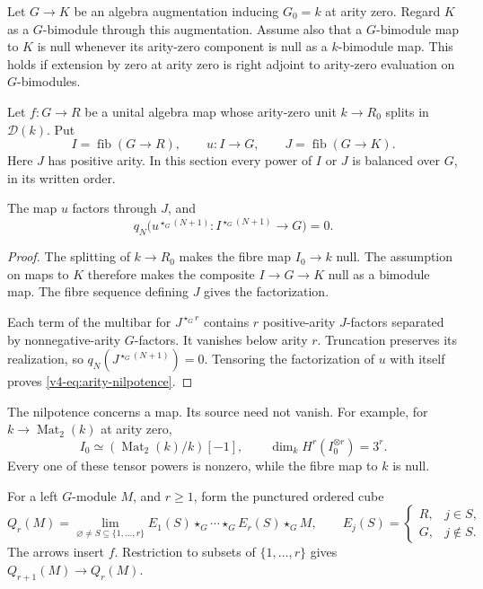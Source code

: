 Let \(G\to K\) be an algebra augmentation inducing \(G_0=k\) at
arity zero. Regard \(K\) as a \(G\)-bimodule through this
augmentation. Assume also that a \(G\)-bimodule map to \(K\)
is null whenever its arity-zero
component is null as a \(k\)-bimodule map.
This holds if extension by zero at arity zero is right adjoint
to arity-zero evaluation on \(G\)-bimodules.

Let \(f:G\to R\) be a unital algebra map whose arity-zero unit
\(k\to R_0\) splits in \(\mathcal D(k)\). Put
\begin{equation}\label{v4-eq:descent-fibres}
 I=\operatorname{fib}(G\to R),\qquad
 u:I\to G,\qquad
 J=\operatorname{fib}(G\to K).
\end{equation}
Here \(J\) has positive arity. In this section every power of
\(I\) or \(J\) is balanced over \(G\), in its written order.

\begin{lemma}\label{v4-lem:arity-nilpotence}
The map \(u\) factors through \(J\), and
\begin{equation}\label{v4-eq:arity-nilpotence}
 q_N\bigl(u^{\star_G(N+1)}:
 I^{\star_G(N+1)}\longrightarrow G\bigr)=0.
\end{equation}
\end{lemma}

\begin{proof}
The splitting of \(k\to R_0\) makes the fibre map \(I_0\to k\)
null. The assumption on maps to \(K\) therefore makes the composite
\(I\to G\to K\) null as a bimodule map. The fibre sequence
defining \(J\) gives the factorization.

Each term of the multibar for \(J^{\star_G r}\) contains \(r\)
positive-arity \(J\)-factors separated by nonnegative-arity
\(G\)-factors. It vanishes below arity \(r\).
Truncation preserves its realization, so
\(q_N(J^{\star_G(N+1)})=0\).
Tensoring the factorization of \(u\) with itself proves
\eqref{v4-eq:arity-nilpotence}.
\end{proof}

The nilpotence concerns a map. Its source need not vanish.
For example, for \(k\to\operatorname{Mat}_2(k)\) at arity zero,
\[
 I_0\simeq(\operatorname{Mat}_2(k)/k)[-1],\qquad
 \dim_k H^r(I_0^{\otimes r})=3^r .
\]
Every one of these tensor powers is nonzero, while the fibre map
to \(k\) is null.

For a left \(G\)-module \(M\), and \(r\geq1\), form the punctured
ordered cube
\begin{equation}\label{v4-eq:punctured-descent-cube}
 Q_r(M)=
 \lim_{\varnothing\ne S\subseteq\{1,\ldots,r\}}
 E_1(S)\star_G\cdots\star_G E_r(S)\star_G M,
 \qquad
 E_j(S)=
 \begin{cases}
 R,&j\in S,\\
 G,&j\notin S.
 \end{cases}
\end{equation}
The arrows insert \(f\). Restriction to subsets of
\(\{1,\ldots,r\}\) gives \(Q_{r+1}(M)\to Q_r(M)\).

